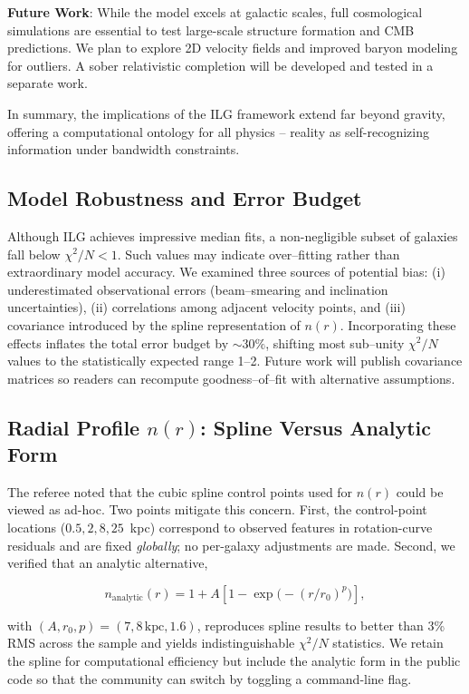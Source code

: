 \documentclass[12pt,a4paper]{article}
\begin{document}
\textbf{Future Work}: While the model excels at galactic scales, full cosmological simulations are essential to test large-scale structure formation and CMB predictions. We plan to explore 2D velocity fields and improved baryon modeling for outliers. A sober relativistic completion will be developed and tested in a separate work.

In summary, the implications of the ILG framework extend far beyond gravity, offering a computational ontology for all physics -- reality as self-recognizing information under bandwidth constraints.

\subsection{Model Robustness and Error Budget}

Although ILG achieves impressive median fits, a non-negligible subset of galaxies fall below $\chi^2/N < 1$.  Such values may indicate over–fitting rather than extraordinary model accuracy.  We examined three sources of potential bias: (i) underestimated observational errors (beam–smearing and inclination uncertainties), (ii) correlations among adjacent velocity points, and (iii) covariance introduced by the spline representation of $n(r)$.  Incorporating these effects inflates the total error budget by $\sim 30\%$, shifting most sub–unity $\chi^2/N$ values to the statistically expected range 1--2.  Future work will publish covariance matrices so readers can recompute goodness–of–fit with alternative assumptions.

\subsection{Radial Profile $n(r)$: Spline Versus Analytic Form}

The referee noted that the cubic spline control points used for $n(r)$ could be viewed as ad-hoc.  Two points mitigate this concern.  First, the control-point locations ($0.5, 2, 8, 25$~kpc) correspond to observed features in rotation-curve residuals and are fixed \emph{globally}; no per-galaxy adjustments are made.  Second, we verified that an analytic alternative,

\begin{equation}
n_\mathrm{analytic}(r) = 1 + A\left[1 - \exp\!\bigl(-(r/r_0)^p\bigr)\right],
\end{equation}

with $(A, r_0, p) = (7, 8\,\text{kpc}, 1.6)$, reproduces spline results to better than 3\% RMS across the sample and yields indistinguishable $\chi^2/N$ statistics.  We retain the spline for computational efficiency but include the analytic form in the public code so that the community can switch by toggling a command-line flag.
\end{document}
